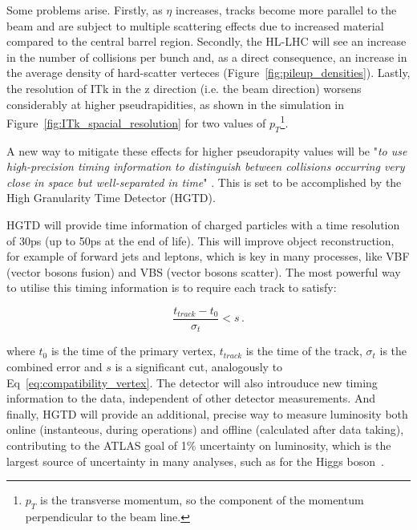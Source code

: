 Some problems arise. 
Firstly, as $\eta$ increases, tracks become more parallel to the beam and are subject to multiple scattering effects due to increased material compared to the central barrel region. Secondly, the HL-LHC will see an increase in the number of collisions per bunch and, as a direct consequence, an increase in the average density of hard-scatter verteces (Figure~\ref{fig:pileup_densities}). Lastly, the resolution of ITk in the z direction (i.e. the beam direction) worsens considerably at higher pseudrapidities, as shown in the simulation in Figure~\ref{fig:ITk_spacial_resolution} for two values of $p_T$\footnote{$p_T$ is the transverse momentum, so the component of the momentum perpendicular to the beam line.}.

A new way to mitigate these effects for higher pseudorapity values will be "\textit{to use high-precision timing information to distinguish between collisions occurring very close in space but well-separated in time}" \cite{CERN-LHCC-2020-007}. This is set to be accomplished by the High Granularity Time Detector (HGTD).

HGTD will provide time information of charged particles with a time resolution of 30ps (up to 50ps at the end of life). %
This will improve object reconstruction, for example of forward jets and leptons, which is key in many processes, like VBF (vector bosons fusion) and VBS (vector bosons scatter). %
The most powerful way to utilise this timing information is to require each track to satisfy:

\begin{equation}
    \frac{t_{track}-t_0}{\sigma_t} < s \,.
\end{equation}

where $t_0$ is the time of the primary vertex, $t_{track}$ is the time of the track, $\sigma_t$ is the combined error and $s$ is a significant cut, analogously to Eq~\ref{eq:compatibility_vertex}. %
The detector will also introuduce new timing information to the data, independent of other detector measurements. And finally, HGTD will provide an additional, precise way to measure luminosity both online (instanteous, during operations) and offline (calculated after data taking), contributing to the ATLAS goal of 1\% uncertainty on luminosity, which is the largest source of uncertainty in many analyses, such as for the Higgs boson~\cite{CERN-LHCC-2020-007}.

